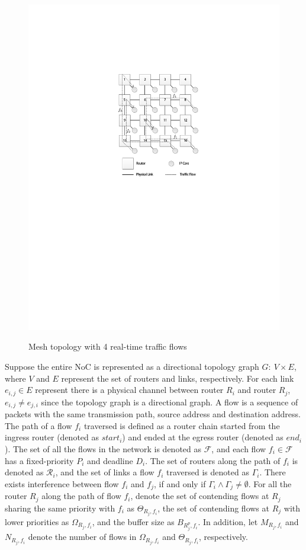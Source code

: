 \documentclass[10pt,journal]{IEEEtran}
\begin{document}
\begin{figure}
  \centering
  \includegraphics[scale=0.9]{figures/mesh.pdf}\\
  \caption{Mesh topology with 4 real-time traffic flows}\label{topology}
\end{figure}

Suppose the entire NoC is represented as a directional topology graph $G:\ V\times E$, where $V$ and $E$ represent the set of routers and links, respectively. For each link $e_{i,j}\in E$ represent there is a physical channel between router $R_i$ and router $R_j$, $e_{i,j}\neq e_{j,i}$ since the topology graph is a directional graph. A flow is a sequence of packets with the same transmission path, source address and destination address. The path of a flow $f_i$ traversed is defined as a router chain started from the ingress router (denoted as $start_i$) and ended at the egress router (denoted as $end_i$). The set of all the flows in the network is denoted as $\mathcal{F}$, and each flow $f_i\in\mathcal{F}$ has a fixed-priority $P_i$ and deadline $D_i$. The set of routers along the path of $f_i$ is denoted as $\mathcal{R}_i$, and the set of links a flow $f_i$ traversed is denoted as $\Gamma_i$. There exists interference between flow $f_i$ and $f_j$, if and only if $\Gamma_i\wedge\Gamma_j\neq\emptyset$. For all the router $R_j$ along the path of flow $f_i$, denote the set of contending flows at $R_j$ sharing the same priority with $f_i$ as $\Theta_{R_j,f_i}$, the set of contending flows at $R_j$ with lower priorities as $\Omega_{R_j,f_i}$, and the buffer size as $B_{R_j^{p},f_i}$. In addition, let $M_{R_j,f_i}$ and $N_{R_j,f_i}$ denote the number of flows in $\Omega_{R_j,f_i}$ and $\Theta_{R_j,f_i}$, respectively.
\end{document}
